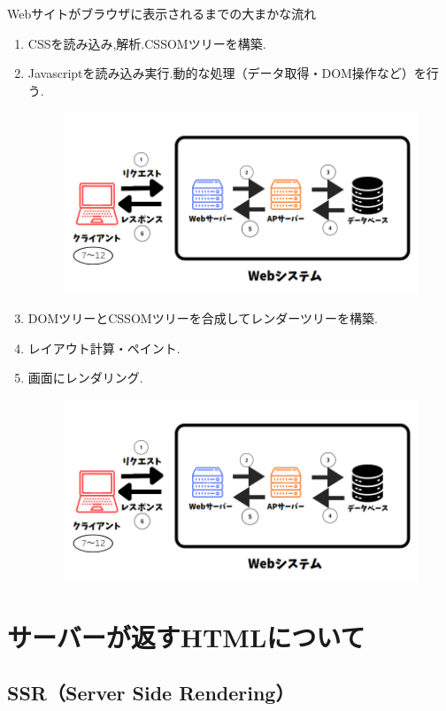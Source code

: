 \documentclass[aspectratio=169]{beamer}
\begin{document}
\begin{frame}[allowframebreaks]{Webサイトがブラウザに表示されるまでの大まかな流れ}
\begin{enumerate}
        \item CSSを読み込み,解析.CSSOMツリーを構築.
        
        \item Javascriptを読み込み実行.動的な処理（データ取得・DOM操作など）を行う.
        \begin{figure}
            \includegraphics[scale=0.25]{webfloat.png}
        \end{figure}
        \newpage
        \item DOMツリーとCSSOMツリーを合成してレンダーツリーを構築.
        \item レイアウト計算・ペイント.
        \item 画面にレンダリング.
        \begin{figure}
            \includegraphics[scale=0.25]{webfloat.png}
        \end{figure}
    \end{enumerate}
    
\end{frame}
\section{サーバーが返すHTMLについて}
\subsection{SSR（Server Side Rendering）}
\end{document}
